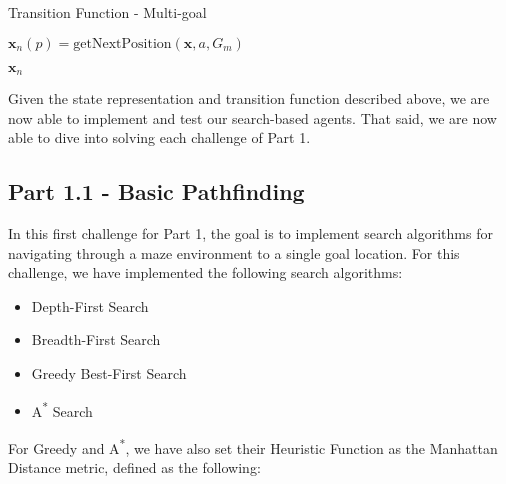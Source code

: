 \documentclass{article}[12pt]
\begin{document}
	\begin{algorithm}[H]
	\caption{Transition Function - Multi-goal }
		 \;
		 
		 \;
		 
		 $\boldsymbol{x}_n(p) = \text{getNextPosition}\left(\boldsymbol{x},a,G_m\right)$
		 \;
		 \;
		 
		 \;
		 \Return $\boldsymbol{x}_n$
	\end{algorithm}
	
	Given the state representation and transition function described above, we are now able to implement and test our search-based agents. That said, we are now able to dive into solving each challenge of Part 1.
	
	\subsection{Part 1.1 - Basic Pathfinding}
   In this first challenge for Part 1, the goal is to implement search algorithms for navigating through a maze environment to a single goal location. For this challenge, we have implemented the following search algorithms:
   
   \begin{itemize}
   \item Depth-First Search
   \item Breadth-First Search
   \item Greedy Best-First Search
   \item A\textsuperscript{*} Search
   \end{itemize}
   
   For Greedy and A\textsuperscript{*}, we have also set their Heuristic Function as the Manhattan Distance metric, defined as the following:
   
\end{document}
